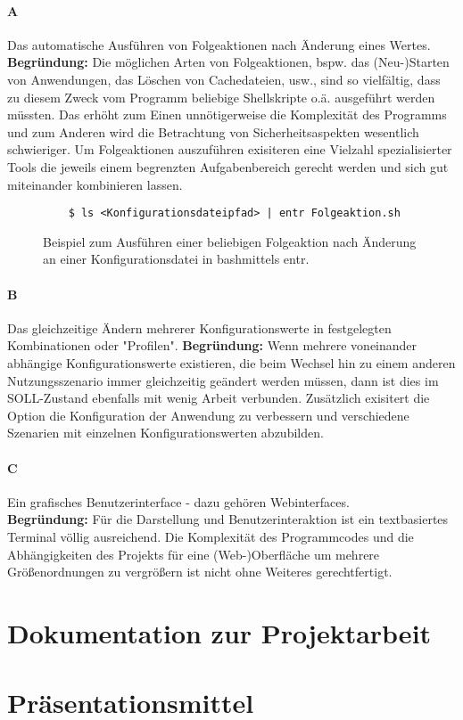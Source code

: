 \documentclass[a4paper,11pt]{article}
\begin{document}
\paragraph{A}
Das automatische Ausführen von Folgeaktionen nach Änderung eines Wertes. \textbf{Begründung:}
Die möglichen Arten von Folgeaktionen, bspw. das (Neu-)Starten von Anwendungen,
das Löschen von Cachedateien, usw., sind so vielfältig, dass zu diesem Zweck vom
Programm beliebige Shellskripte o.ä. ausgeführt werden müssten. Das erhöht zum Einen
unnötigerweise die Komplexität des Programms und zum Anderen wird die Betrachtung von
Sicherheitsaspekten wesentlich schwieriger. Um Folgeaktionen auszuführen exisiteren
eine Vielzahl spezialisierter Tools die jeweils einem begrenzten Aufgabenbereich
gerecht werden und sich gut miteinander kombinieren lassen.

\begin{figure}[!ht]
	\caption[cdba]{Beispiel zum Ausführen einer beliebigen Folgeaktion nach
		Änderung an einer Konfigurationsdatei in bash\footnotemark mittels entr.\footnotemark}
	\begin{verbatim}
    $ ls <Konfigurationsdateipfad> | entr Folgeaktion.sh
\end{verbatim}
\end{figure}

\paragraph{B}
Das gleichzeitige Ändern mehrerer Konfigurationswerte in festgelegten Kombinationen
oder "Profilen". \textbf{Begründung:} Wenn mehrere voneinander abhängige Konfigurationswerte
existieren, die beim Wechsel hin zu einem anderen Nutzungsszenario immer gleichzeitig
geändert werden müssen, dann ist dies im SOLL-Zustand ebenfalls mit wenig Arbeit
verbunden. Zusätzlich exisitert die Option die Konfiguration der Anwendung zu
verbessern und verschiedene Szenarien mit einzelnen Konfigurationswerten abzubilden.
\paragraph{C}
Ein grafisches Benutzerinterface - dazu gehören Webinterfaces. \\
\textbf{Begründung:} Für die Darstellung und Benutzerinteraktion ist ein
textbasiertes Terminal völlig ausreichend. Die Komplexität des Programmcodes und
die Abhängigkeiten des Projekts für eine (Web-)Oberfläche um mehrere
Größenordnungen zu vergrößern ist nicht ohne Weiteres gerechtfertigt.

\section{Dokumentation zur Projektarbeit}

\section{Präsentationsmittel}
\end{document}

